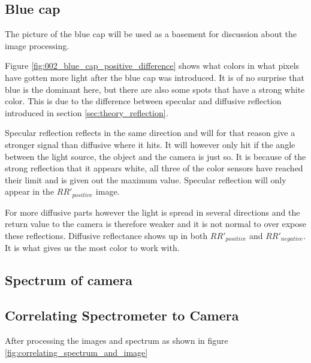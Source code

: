 \subsection{Blue cap}
\label{sec:blue_cap_discussion}
The picture of the blue cap will be used as a basement for discussion about the image processing. 

Figure \ref{fig:002_blue_cap_positive_difference} shows what colors in what pixels have gotten more light after the blue cap was introduced. It is of no surprise that blue is the dominant here, but there are also some spots that have a strong white color. This is due to the difference between specular and diffusive reflection introduced in section \ref{sec:theory_reflection}. 

Specular reflection reflects in the same direction and will for that reason give a stronger signal than diffusive where it hits. It will however only hit if the angle between the light source, the object and the camera is just so. It is because of the strong reflection that it appears white, all three of the color sensors have reached their limit and is given out the maximum value. Specular reflection will only appear in the $RR'_{positive}$ image. 

For more diffusive parts however the light is spread in several directions and the return value to the camera is therefore weaker and it is not normal to over expose these reflections. Diffusive reflectance shows up in both $RR'_{positive}$ and $RR'_{negative}$. It is what gives us the most color to work with. 


\subsection{Spectrum of camera}

\subsection{Correlating Spectrometer to Camera}

After processing the images and spectrum as shown in figure \ref{fig:correlating_spectrum_and_image} 